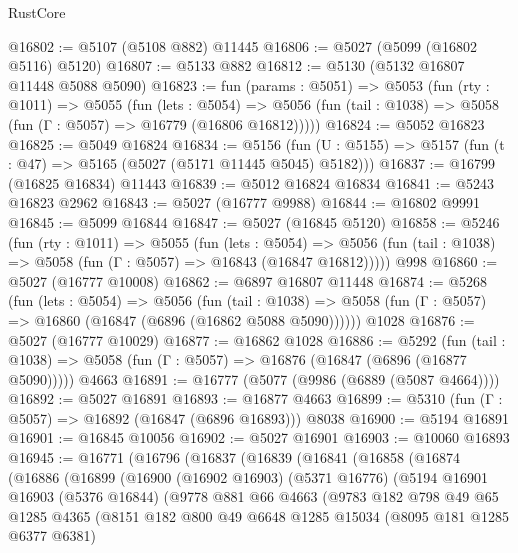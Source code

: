 \begin{lexlean}{RustCore}
\begin{coremodule}
@16802 := @5107 (@5108 @882) @11445
@16806 := @5027 (@5099 (@16802 @5116) @5120)
@16807 := @5133 @882
@16812 := @5130 (@5132 @16807 @11448 @5088 @5090)
@16823 := fun (params : @5051) =>
  @5053
    (fun (rty : @1011) =>
    @5055
      (fun (lets : @5054) =>
      @5056 (fun (tail : @1038) => @5058 (fun (Γ : @5057) => @16779 (@16806 @16812)))))
@16824 := @5052 @16823
@16825 := @5049 @16824
@16834 := @5156
    (fun (U : @5155) => @5157 (fun (t : @47) => @5165 (@5027 (@5171 @11445 @5045) @5182)))
@16837 := @16799 (@16825 @16834) @11443
@16839 := @5012 @16824 @16834
@16841 := @5243 @16823 @2962
@16843 := @5027 (@16777 @9988)
@16844 := @16802 @9991
@16845 := @5099 @16844
@16847 := @5027 (@16845 @5120)
@16858 := @5246
    (fun (rty : @1011) =>
    @5055
      (fun (lets : @5054) =>
      @5056 (fun (tail : @1038) => @5058 (fun (Γ : @5057) => @16843 (@16847 @16812)))))
    @998
@16860 := @5027 (@16777 @10008)
@16862 := @6897 @16807 @11448
@16874 := @5268
    (fun (lets : @5054) =>
    @5056
      (fun (tail : @1038) =>
      @5058 (fun (Γ : @5057) => @16860 (@16847 (@6896 (@16862 @5088 @5090))))))
    @1028
@16876 := @5027 (@16777 @10029)
@16877 := @16862 @1028
@16886 := @5292
    (fun (tail : @1038) => @5058 (fun (Γ : @5057) => @16876 (@16847 (@6896 (@16877 @5090)))))
    @4663
@16891 := @16777 (@5077 (@9986 (@6889 (@5087 @4664))))
@16892 := @5027 @16891
@16893 := @16877 @4663
@16899 := @5310 (fun (Γ : @5057) => @16892 (@16847 (@6896 @16893))) @8038
@16900 := @5194 @16891
@16901 := @16845 @10056
@16902 := @5027 @16901
@16903 := @10060 @16893
@16945 := @16771
    (@16796
      (@16837
        (@16839
          (@16841
            (@16858
              (@16874
                (@16886
                  (@16899
                    (@16900
                      (@16902 @16903)
                      (@5371 @16776)
                      (@5194
                        @16901
                        @16903
                        (@5376 @16844)
                        (@9778
                          @881
                          @66
                          @4663
                          (@9783
                            @182
                            @798
                            @49
                            @65
                            @1285
                            @4365
                            (@8151
                              @182
                              @800
                              @49
                              @6648
                              @1285
                              @15034
                              (@8095 @181 @1285 @6377 @6381)

\end{coremodule}
\end{lexlean}
